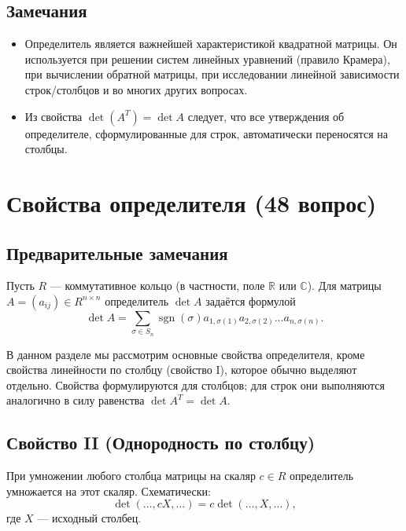 \documentclass[a4paper,12pt]{article}
\theoremstyle{definition}
\theoremstyle{plain}
\theoremstyle{remark}
\begin{document}
	\subsection{Замечания}
	
	\begin{itemize}
		\item Определитель является важнейшей характеристикой квадратной матрицы. Он используется при решении систем линейных уравнений (правило Крамера), при вычислении обратной матрицы, при исследовании линейной зависимости строк/столбцов и во многих других вопросах.
		\item Из свойства \( \det(A^T) = \det A \) следует, что все утверждения об определителе, сформулированные для строк, автоматически переносятся на столбцы.
	\end{itemize}
	
	
	
	
	\newpage
	\section{Свойства определителя (48 вопрос)}
	
	\subsection{Предварительные замечания}
	
	Пусть \( R \) — коммутативное кольцо (в частности, поле \( \mathbb{R} \) или \( \mathbb{C} \)). Для матрицы \( A = (a_{ij}) \in R^{n \times n} \) определитель \( \det A \) задаётся формулой
	\[
	\det A = \sum_{\sigma \in S_n} \operatorname{sgn}(\sigma) a_{1,\sigma(1)} a_{2,\sigma(2)} \dots a_{n,\sigma(n)}.
	\]
	
	В данном разделе мы рассмотрим основные свойства определителя, кроме свойства линейности по столбцу (свойство I), которое обычно выделяют отдельно. Свойства формулируются для столбцов; для строк они выполняются аналогично в силу равенства \( \det A^T = \det A \).
	
	\subsection{Свойство II (Однородность по столбцу)}
	
	\begin{tcolorbox}[colback=blue!5, colframe=blue!40!black, title=Свойство II]
		При умножении любого столбца матрицы на скаляр \( c \in R \) определитель умножается на этот скаляр. Схематически:
		\[
		\det(\dots, cX, \dots) = c \det(\dots, X, \dots),
		\]
		где \( X \) — исходный столбец.
	\end{tcolorbox}
	
\end{document}
